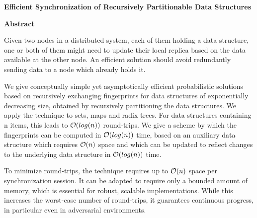 
\thispagestyle{plain}
\begin{center}
    \Large
    \textbf{Efficient Synchronization of Recursively Partitionable Data Structures}
       
    \vspace{0.9cm}
    \textbf{Abstract}
\end{center}

Given two nodes in a distributed system, each of them holding a data structure, one or both of them might need to update their local replica based on the data available at the other node.
An efficient solution should avoid redundantly sending data to a node which already holds it.

We give conceptually simple yet asymptotically efficient probabilistic solutions based on recursively exchanging fingerprints for data structures of exponentially decreasing size, obtained by recursively partitioning the data structures.
We apply the technique to sets, maps and radix trees.
For data structures containing n items, this leads to $\mathcal{O}(log(n))$ round-trips.
We give a scheme by which the fingerprints can be computed in $\mathcal{O}(log(n))$ time, based on an auxiliary data structure which requires $\mathcal{O}(n)$ space and which can be updated to reflect changes to the underlying data structure in $\mathcal{O}(log(n))$ time.

To minimize round-trips, the technique requires up to $\mathcal{O}(n)$ space per synchronization session.
It can be adapted to require only a bounded amount of memory, which is essential for robust, scalable implementations.
While this increases the worst-case number of round-trips, it guarantees continuous progress, in particular even in adversarial environments.